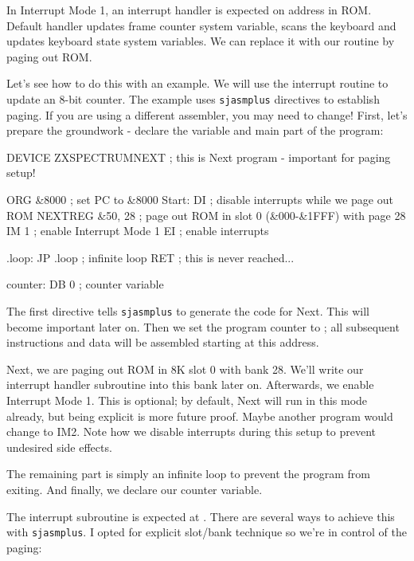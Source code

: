 In Interrupt Mode 1, an interrupt handler is expected on address  in ROM. Default handler updates frame counter system variable, scans the keyboard and updates keyboard state system variables. We can replace it with our routine by paging out ROM.

Let's see how to do this with an example. We will use the interrupt routine to update an 8-bit counter. The example uses {\tt sjasmplus} directives to establish paging. If you are using a different assembler, you may need to change! First, let's prepare the groundwork - declare the variable and main part of the program:

\begin{tcblisting}{}
    DEVICE ZXSPECTRUMNEXT ; this is Next program - important for paging setup!

    ORG &8000              ; set PC to &8000
Start:
    DI                     ; disable interrupts while we page out ROM
    NEXTREG &50, 28        ; page out ROM in slot 0 (&000-&1FFF) with page 28
    IM 1                   ; enable Interrupt Mode 1
    EI                     ; enable interrupts

.loop:
    JP .loop               ; infinite loop
    RET                    ; this is never reached...

counter: DB 0              ; counter variable
\end{tcblisting}

The first directive tells {\tt sjasmplus} to generate the code for Next. This will become important later on. Then we set the program counter to ; all subsequent instructions and data will be assembled starting at this address.

Next, we are paging out ROM in 8K slot 0 with bank 28. We'll write our interrupt handler subroutine into this bank later on. Afterwards, we enable Interrupt Mode 1. This is optional; by default, Next will run in this mode already, but being explicit is more future proof. Maybe another program would change to IM2. Note how we disable interrupts during this setup to prevent undesired side effects.

The remaining part is simply an infinite loop to prevent the program from exiting. And finally, we declare our counter variable.

The interrupt subroutine is expected at . There are several ways to achieve this with {\tt sjasmplus}. I opted for explicit slot/bank technique so we're in control of the paging:

